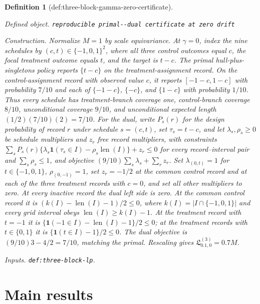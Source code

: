 \documentclass{article}
\newtheorem{definition}{Definition}
\begin{document}
\begin{definition}[def:three-block-gamma-zero-certificate]\label{def:three-block-gamma-zero-certificate}
\par\smallskip\noindent\emph{Defined object.} \texttt{reproducible primal-\allowbreak{}-\allowbreak{}dual certificate at zero drift}
\par\smallskip\noindent\emph{Construction.} Normalize \(M=1\) by scale equivariance. At \(\gamma=0\), index the nine schedules by \((c,t)\in\{-1,0,1\}^2\), where all three control outcomes equal \(c\), the focal treatment outcome equals \(t\), and the target is \(t-c\). The primal hull-plus-singletons policy reports \(\{t-c\}\) on the treatment-assignment record. On the control-assignment record with observed value \(c\), it reports \([-1-c,1-c]\) with probability \(7/10\) and each of \(\{-1-c\}\), \(\{-c\}\), and \(\{1-c\}\) with probability \(1/10\). Thus every schedule has treatment-branch coverage one, control-branch coverage \(8/10\), unconditional coverage \(9/10\), and unconditional expected length \((1/2)(7/10)(2)=7/10\). For the dual, write \(P_s(r)\) for the design probability of record \(r\) under schedule \(s=(c,t)\), set \(\tau_s=t-c\), and let \(\lambda_s,\rho_s\ge0\) be schedule multipliers and \(z_r\) free record multipliers, with constraints \(\sum_sP_s(r)\{\lambda_s\mathbf 1(\tau_s\in I)-\rho_s\operatorname{len}(I)\}+z_r\le0\) for every record--interval pair and \(\sum_s\rho_s\le1\), and objective \((9/10)\sum_s\lambda_s+\sum_rz_r\). Set \(\lambda_{(0,t)}=1\) for \(t\in\{-1,0,1\}\), \(\rho_{(0,-1)}=1\), set \(z_r=-1/2\) at the common control record and at each of the three treatment records with \(c=0\), and set all other multipliers to zero. At every inactive record the dual left side is zero. At the common control record it is \((k(I)-\operatorname{len}(I)-1)/2\le0\), where \(k(I)=|I\cap\{-1,0,1\}|\) and every grid interval obeys \(\operatorname{len}(I)\ge k(I)-1\). At the treatment record with \(t=-1\) it is \(\{\mathbf 1(-1\in I)-\operatorname{len}(I)-1\}/2\le0\); at the treatment records with \(t\in\{0,1\}\) it is \(\{\mathbf 1(t\in I)-1\}/2\le0\). The dual objective is \((9/10)3-4/2=7/10\), matching the primal. Rescaling gives \(\mathfrak L^{(3)}_{0.1,0}=0.7M\).
\par\smallskip\noindent\emph{Inputs.} \texttt{def:\allowbreak{}three-\allowbreak{}block-\allowbreak{}lp}.
\end{definition}

\section{Main results}
\end{document}
